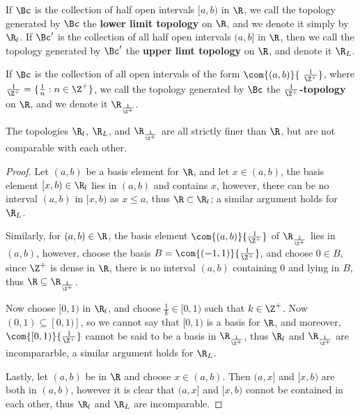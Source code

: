 \begin{definition}
    If $\Bc$ is the collection of half open intervals  $[a,b)$ in  $\R$, we call the
    topology generated by  $\Bc$ the \textbf{lower limit topology} on $\R$, and we
    denote it simply by  $\R_l$. If $\Bc'$ is the collection of all half open intervals  $(a,b]$
    in  $\R$, then we call the topology generated by  $\Bc'$ the \textbf{upper limt topology}
    on $\R$, and denote it  $\R_L$.
\end{definition}

\begin{definition}
    If $\Bc$ is the collection of all open intervals of the form  $\com{(a,b)}{\ \frac{1}{\Z^+}}$,
    where $\frac{1}{\Z^+}=\{\frac{1}{n}: n \in \Z^+\}$, we call the topology generated by $\Bc$ the
    \textbf{$\frac{1}{\Z^+}$-topology} on $\R$, and we denote it  $\R_{\frac{1}{\Z^+}}$.
\end{definition}

\begin{lemma}\label{1.2.4}
    The topologies $\R_l$,  $\R_L$, and  $\R_{\frac{1}{\Z^+}}$ are all strictly finer than $\R$,
    but are not comparable with each other.
\end{lemma}
\begin{proof}
    Let $(a,b)$ be a basis element for  $\R$, and let  $x \in (a,b)$, the basis element $[x,b) \in \R_l$
    lies in $(a,b)$ and contains $x$, however, there can be no interval  $(a,b)$ in  $[x,b)$ as
     $x \leq a$, thus  $\R \subset \R_l$; a similar argument holds for  $\R_L$.

     Similarly, for  $(a,b) \in \R$, the basis element  $\com{(a,b)}{ \frac{1}{\Z^+}}$ of $\R_{\frac{1}{\Z^+}}$
     lies in $(a,b)$, however, choose the basis $B=\com{(-1,1)}{\frac{1}{\Z^+}}$, and
     choose $0 \in B$, since  $\Z^+$ is dense in  $\R$, there is no interval  $(a,b)$ containing  $0$
     and lying in  $B$, thus  $\R \subseteq \R_{\frac{1}{\Z^+}}$.

     Now choose $[0,1)$ in  $\R_l$, and choose  $ \frac{1}{k} \in [0,1)$ such that $k \in \Z^+$. Now
     $(0,1) \subseteq [0,1)]$, so we cannot say that $[0,1)$ is a basis for  $\R$, and moreover,
     $\com{[0,1)}{\frac{1}{\Z^+}}$ cannot be said to be a basis in $\R_{\frac{1}{\Z^+}}$, thus
     $\R_l$ and  $\R_{\frac{1}{\Z^+}}$ are incompararble, a similar argument holds for $\R_L$.

     Lastly, let  $(a,b)$ be in  $\R$ and choose  $x \in (a,b)$. Then $(a,x]$ and  $[x,b)$ are
     both in  $(a,b)$, however it is clear that  $(a,x]$ and  $[x,b)$ connot be contained in each other,
     thus $\R_l$ and  $\R_L$ are incomparable.
\end{proof}

